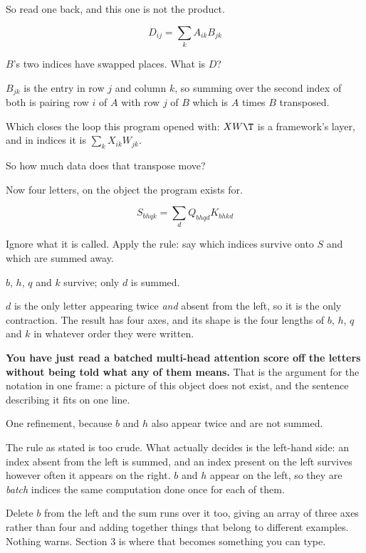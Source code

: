 \begin{fr}
So read one back, and this one is not the product.

\[ D_{ij} = \sum_k A_{ik} B_{jk} \]

$B$'s two indices have swapped places. What is $D$?
\dotline
\nextframe
\end{fr}

\begin{fr}
$B_{jk}$ is the entry in row $j$ and column $k$, so summing over the second
index of both is pairing row $i$ of $A$ with row $j$ of $B$ \dash{} which is
$A$ times $B$ transposed.

Which closes the loop this program opened with: $XW\T$ is a framework's layer,
and in indices it is $\sum_k X_{ik} W_{jk}$.

So how much data does that transpose move?
\dotline
\nextframe
\end{fr}

\begin{fr}
Now four letters, on the object the program exists for.

\[ S_{bhqk} = \sum_d Q_{bhqd} K_{bhkd} \]

Ignore what it is called. Apply the rule: say which indices survive onto $S$
and which are summed away.
\dotline
\nextframe
\end{fr}

\begin{fr}
\begin{ansblock}
$b$, $h$, $q$ and $k$ survive; only $d$ is summed.
\end{ansblock}

$d$ is the only letter appearing twice \emph{and} absent from the left, so it
is the only contraction. The result has four axes, and its shape is the four
lengths of $b$, $h$, $q$ and $k$ in whatever order they were written.

\textbf{You have just read a batched multi-head attention score off the letters
without being told what any of them means.} That is the argument for the
notation in one frame: a picture of this object does not exist, and the
sentence describing it fits on one line.
\end{fr}

\begin{fr}
One refinement, because $b$ and $h$ also appear twice and are not summed.

The rule as stated is too crude. What actually decides is the left-hand side:
an index absent from the left is summed, and an index present on the left
survives however often it appears on the right. $b$ and $h$ appear on the left,
so they are \emph{batch} indices \dash{} the same computation done once for
each of them.

Delete $b$ from the left and the sum runs over it too, giving an array of three
axes rather than four and adding together things that belong to different
examples. Nothing warns. Section 3 is where that becomes something you can
type.
\end{fr}

